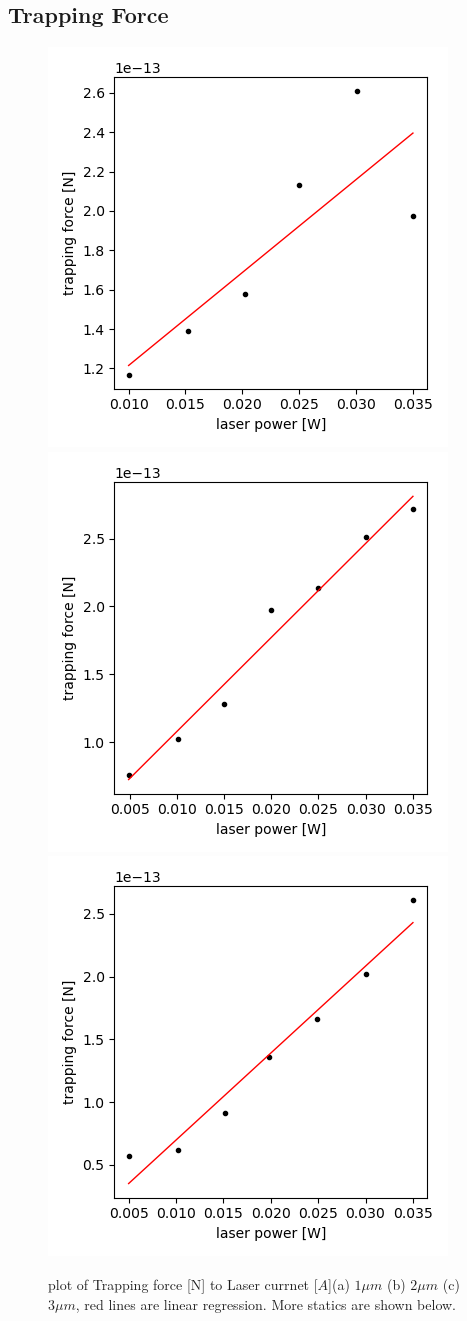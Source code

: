 \documentclass{article}
\begin{document}
\subsection{Trapping Force}
\label{results:tweezing_force}
\begin{figure}[H]
    \centering
    \includegraphics[width=0.32\linewidth]{../results/1um_force_raw_plot.png}
    \includegraphics[width=0.32\linewidth]{../results/2um_force_raw_plot.png}
    \includegraphics[width=0.32\linewidth]{../results/3um_force_raw_plot.png}
    \caption{plot of Trapping force [N] to Laser currnet [$A$](a) $1\mu m$ (b) $2\mu m$ (c) $3\mu m$, red lines are linear regression. More statics are shown below.}
    \label{Figure:force_raw_fig}
\end{figure}
\end{document}
